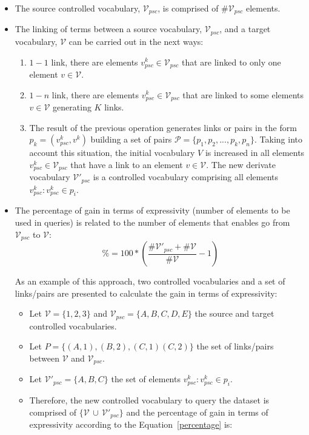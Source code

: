 \begin{itemize}
 \item The source controlled vocabulary, $\mathcal{V}_{psc}$, is comprised of \#$\mathcal{V}_{psc}$ elements.
 \item The linking of terms between a source vocabulary, $\mathcal{V}_{psc}$, and  a target vocabulary, $\mathcal{V}$ can be carried out in the next ways:
 \begin{enumerate}
  \item $1-1$ link, there are elements $v^k_{psc} \in \mathcal{V}_{psc}$ that are linked to only one element $v \in \mathcal{V}$.
  \item $1-n$ link, there are elements $v^k_{psc} \in \mathcal{V}_{psc}$ that are linked to some elements $v \in \mathcal{V}$ generating $K$ links.  
  \item The result of the previous operation generates links or pairs in the form $p_k=(v^k_{psc}, v^k)$ building a set of pairs $\mathcal{P}=\{p_1,p_2,...,p_k,p_n\}$. Taking into account this situation, 
  the initial vocabulary $V$ is increased in all elements $v^k_{psc} \in \mathcal{V}_{psc}$ that have a link to an element $v \in \mathcal{V}$. The new 
  derivate vocabulary $\mathcal{V'}_{psc}$ is a controlled vocabulary comprising all elements $v^k_{psc}: v^k_{psc} \in p_i$.
 \end{enumerate}
 
 \item The percentage of gain in terms of expressivity (number of elements to be used in queries) is related to the number of elements that enables go from $\mathcal{V}_{psc}$ to $\mathcal{V}$:	
 \begin{equation}\label{percentage}
  \%=100*(\frac{\#\mathcal{V'}_{psc} + \#\mathcal{V}}{\#\mathcal{V}}-1)
 \end{equation}
 
  As an example of this approach, two controlled vocabularies and a set of links/pairs are presented to calculate the gain in terms of expressivity:
  \begin{itemize}
  \item Let $\mathcal{V} = \{ 1, 2, 3 \}$  and  $\mathcal{V}_{psc} = \{A, B, C, D, E\}$ the source and target controlled vocabularies.
  \item Let $P = \{ (A,1), (B,2), (C,1) (C,2) \}$ the set of links/pairs between $\mathcal{V}$ and $\mathcal{V}_{psc}$.
  \item Let $\mathcal{V'}_{psc} = \{ A, B, C \}$ the set of elements $v^k_{psc}: v^k_{psc} \in p_i$.
  \item Therefore, the new controlled vocabulary to query the dataset is comprised of $\{\mathcal{V}\,\cup\,\mathcal{V'}_{psc}\}$ and the percentage of gain in terms of expressivity 
  according to the Equation~\ref{percentage} is:


\end{itemize}
\end{itemize}
